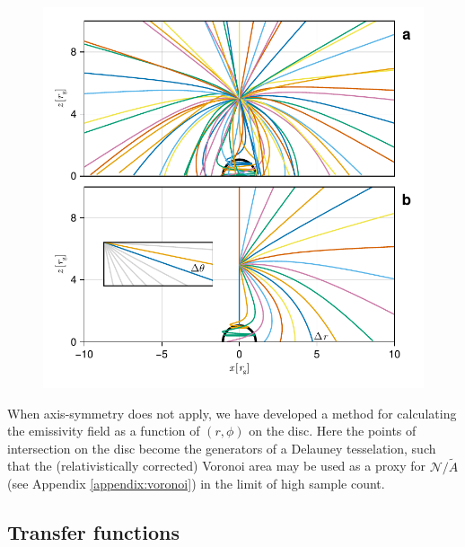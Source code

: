 \begin{figure}
    \centering
    \includegraphics[width=0.95\linewidth]{figures/emissivity.coronal-traces.pdf}
    \caption{}
    \label{fig:coronal-tracing}
\end{figure}

When axis-symmetry does not apply, we have developed a method for calculating the emissivity field as a function of $(r, \phi)$ on the disc. Here the points of intersection on the disc become the generators of a Delauney tesselation, such that the (relativistically corrected) Voronoi area may be used as a proxy for $\mathcal{N} /\tilde{A}$ (see Appendix \ref{appendix:voronoi}) in the limit of high sample count.

\subsection{Transfer functions}
\label{sec:transfer-functions}

